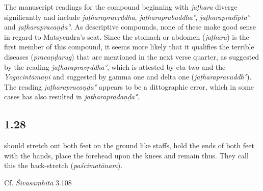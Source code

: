 \begin{ekdosis}
\begin{testimonia}[hp01_027]
\begin{versinnote}
\end{versinnote}

\end{testimonia}

\begin{philcomm}[hp01_027]
The manuscript readings for the compound beginning with \emph{jaṭhara} diverge significantly and include \emph{jaṭharapravṛddha}, \emph{jaṭharaprabuddha°}, \emph{jaṭharapradīpta°} and \emph{jaṭharapracaṇḍa°}. As descriptive compounds, none of these make good sense in regard to Matsyendra's seat. Since the stomach or abdomen (\emph{jaṭhara}) is the first member of this compound, it seems more likely that it qualifies the terrible diseases (\emph{pracaṇḍarug}) that are mentioned in the next verse quarter, as suggested by the reading \emph{jaṭharapravṛddha°}, which is attested by eta two and the \textit{Yogacintāmaṇi} and suggested by gamma one and delta one (\emph{jaṭharapravuddh°}). The reading \emph{jaṭharapracaṇḍa°} appears to be a dittographic error, which in some cases has also resulted in \emph{jaṭharapradaṇḍa°}.
\end{philcomm}

\subsection*{1.28}
\begin{translation} should stretch out both feet on the ground like staffs, hold the ends of both feet with the hands, place the forehead upon the knees and remain thus. They call this the back-stretch (\emph{paścimatānam}).
\end{translation}

\begin{sources}[hp01_028]
Cf. \emph{Śivasaṃhitā} 3.108

\begin{versinnote}
\end{versinnote}


\end{sources}
\end{ekdosis}
